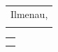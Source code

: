 \begin{tabular}{l}
	Ilmenau, \settingsFinishDate \\
	\\
\end{tabular}
\hfill
\begin{tabular}{c}
	{\makebox[6.0cm]{\dotfill}} \\
	\settingsName               \\
\end{tabular}

\cleardoublepage
